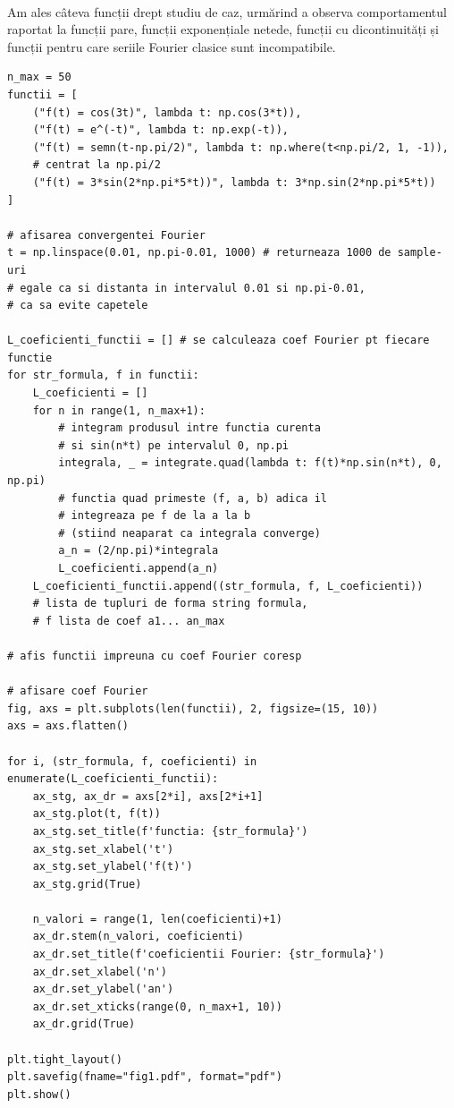 \documentclass{article}
\begin{document}
    \paragraph{} Am ales câteva funcții drept studiu de caz, urmărind a observa comportamentul raportat la funcții pare, funcții exponențiale netede, funcții cu dicontinuități și funcții pentru care seriile Fourier clasice sunt incompatibile.
\begin{verbatim}
n_max = 50
functii = [
    ("f(t) = cos(3t)", lambda t: np.cos(3*t)),
    ("f(t) = e^(-t)", lambda t: np.exp(-t)),
    ("f(t) = semn(t-np.pi/2)", lambda t: np.where(t<np.pi/2, 1, -1)), 
    # centrat la np.pi/2
    ("f(t) = 3*sin(2*np.pi*5*t))", lambda t: 3*np.sin(2*np.pi*5*t))
]

# afisarea convergentei Fourier
t = np.linspace(0.01, np.pi-0.01, 1000) # returneaza 1000 de sample-uri
# egale ca si distanta in intervalul 0.01 si np.pi-0.01,
# ca sa evite capetele

L_coeficienti_functii = [] # se calculeaza coef Fourier pt fiecare functie
for str_formula, f in functii:
    L_coeficienti = []
    for n in range(1, n_max+1):        
        # integram produsul intre functia curenta 
        # si sin(n*t) pe intervalul 0, np.pi
        integrala, _ = integrate.quad(lambda t: f(t)*np.sin(n*t), 0, np.pi) 
        # functia quad primeste (f, a, b) adica il 
        # integreaza pe f de la a la b 
        # (stiind neaparat ca integrala converge)
        a_n = (2/np.pi)*integrala
        L_coeficienti.append(a_n)
    L_coeficienti_functii.append((str_formula, f, L_coeficienti))
    # lista de tupluri de forma string formula, 
    # f lista de coef a1... an_max
    
# afis functii impreuna cu coef Fourier coresp

# afisare coef Fourier
fig, axs = plt.subplots(len(functii), 2, figsize=(15, 10))
axs = axs.flatten()

for i, (str_formula, f, coeficienti) in enumerate(L_coeficienti_functii):
    ax_stg, ax_dr = axs[2*i], axs[2*i+1]
    ax_stg.plot(t, f(t))
    ax_stg.set_title(f'functia: {str_formula}')
    ax_stg.set_xlabel('t')
    ax_stg.set_ylabel('f(t)')
    ax_stg.grid(True)

    n_valori = range(1, len(coeficienti)+1)
    ax_dr.stem(n_valori, coeficienti)
    ax_dr.set_title(f'coeficientii Fourier: {str_formula}')
    ax_dr.set_xlabel('n')
    ax_dr.set_ylabel('an')
    ax_dr.set_xticks(range(0, n_max+1, 10))
    ax_dr.grid(True)

plt.tight_layout()
plt.savefig(fname="fig1.pdf", format="pdf")
plt.show()
\end{verbatim}
\end{document}
